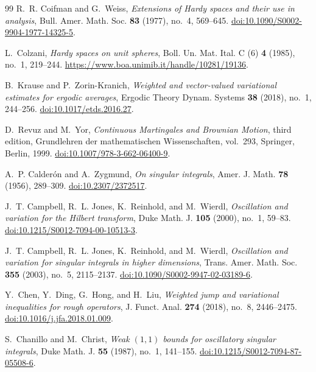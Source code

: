 \documentclass[11pt]{article}
\numberwithin{equation}{section}
\theoremstyle{remark}
\theoremstyle{definition}
\begin{document}
\begin{thebibliography}{99}
R.~R. Coifman and G.~Weiss,
\emph{Extensions of Hardy spaces and their use in analysis},
Bull. Amer. Math. Soc. \textbf{83} (1977), no.~4, 569--645.
\href{https://doi.org/10.1090/S0002-9904-1977-14325-5}
{doi:10.1090/S0002-9904-1977-14325-5}.

L.~Colzani,
\emph{Hardy spaces on unit spheres},
Boll. Un. Mat. Ital. C (6) \textbf{4} (1985), no.~1, 219--244.
\url{https://www.boa.unimib.it/handle/10281/19136}.

B.~Krause and P.~Zorin-Kranich,
\emph{Weighted and vector-valued variational estimates for ergodic averages},
Ergodic Theory Dynam. Systems \textbf{38} (2018), no.~1, 244--256.
\href{https://doi.org/10.1017/etds.2016.27}{doi:10.1017/etds.2016.27}.

D.~Revuz and M.~Yor,
\emph{Continuous Martingales and Brownian Motion},
third edition, Grundlehren der mathematischen Wissenschaften, vol.~293,
Springer, Berlin, 1999.
\href{https://doi.org/10.1007/978-3-662-06400-9}
{doi:10.1007/978-3-662-06400-9}.

A.~P. Calder\'on and A.~Zygmund,
\emph{On singular integrals},
Amer. J. Math. \textbf{78} (1956), 289--309.
\href{https://doi.org/10.2307/2372517}{doi:10.2307/2372517}.

J.~T. Campbell, R.~L. Jones, K.~Reinhold, and M.~Wierdl,
\emph{Oscillation and variation for the Hilbert transform},
Duke Math. J. \textbf{105} (2000), no.~1, 59--83.
\href{https://doi.org/10.1215/S0012-7094-00-10513-3}
{doi:10.1215/S0012-7094-00-10513-3}.

J.~T. Campbell, R.~L. Jones, K.~Reinhold, and M.~Wierdl,
\emph{Oscillation and variation for singular integrals in higher dimensions},
Trans. Amer. Math. Soc. \textbf{355} (2003), no.~5, 2115--2137.
\href{https://doi.org/10.1090/S0002-9947-02-03189-6}
{doi:10.1090/S0002-9947-02-03189-6}.

Y.~Chen, Y.~Ding, G.~Hong, and H.~Liu,
\emph{Weighted jump and variational inequalities for rough operators},
J. Funct. Anal. \textbf{274} (2018), no.~8, 2446--2475.
\href{https://doi.org/10.1016/j.jfa.2018.01.009}
{doi:10.1016/j.jfa.2018.01.009}.

S.~Chanillo and M.~Christ,
\emph{Weak $(1,1)$ bounds for oscillatory singular integrals},
Duke Math. J. \textbf{55} (1987), no.~1, 141--155.
\href{https://doi.org/10.1215/S0012-7094-87-05508-6}
{doi:10.1215/S0012-7094-87-05508-6}.


\end{thebibliography}
\end{document}
